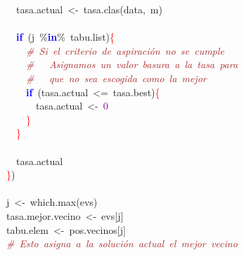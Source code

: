 \mbox{}\ \ \ \ \ \ tasa\textcolor{BrickRed}{.}actual\ \textcolor{BrickRed}{\textless{}-}\ tasa\textcolor{BrickRed}{.}clas\textcolor{BrickRed}{(}data\textcolor{BrickRed}{,}\ m\textcolor{BrickRed}{)} \\
\mbox{}\ \ \ \ \ \  \\
\mbox{}\ \ \ \ \ \ \textbf{\textcolor{Blue}{if}}\ \textcolor{BrickRed}{(}j\ \textcolor{BrickRed}{\%}\textbf{\textcolor{Blue}{in}}\textcolor{BrickRed}{\%}\ tabu\textcolor{BrickRed}{.}list\textcolor{BrickRed}{)}\textcolor{Red}{\{} \\
\mbox{}\ \ \ \ \ \ \ \ \textit{\textcolor{Brown}{\#\ Si\ el\ criterio\ de\ aspiración\ no\ se\ cumple}} \\
\mbox{}\ \ \ \ \ \ \ \ \textit{\textcolor{Brown}{\#\ \ \ Asignamos\ un\ valor\ basura\ a\ la\ tasa\ para}} \\
\mbox{}\ \ \ \ \ \ \ \ \textit{\textcolor{Brown}{\#\ \ \ que\ no\ sea\ escogida\ como\ la\ mejor}} \\
\mbox{}\ \ \ \ \ \ \ \ \textbf{\textcolor{Blue}{if}}\ \textcolor{BrickRed}{(}tasa\textcolor{BrickRed}{.}actual\ \textcolor{BrickRed}{\textless{}=}\ tasa\textcolor{BrickRed}{.}best\textcolor{BrickRed}{)}\textcolor{Red}{\{} \\
\mbox{}\ \ \ \ \ \ \ \ \ \ tasa\textcolor{BrickRed}{.}actual\ \textcolor{BrickRed}{\textless{}-}\ \textcolor{Purple}{0} \\
\mbox{}\ \ \ \ \ \ \ \ \textcolor{Red}{\}} \\
\mbox{}\ \ \ \ \ \ \textcolor{Red}{\}} \\
\mbox{}\ \ \ \ \ \  \\
\mbox{}\ \ \ \ \ \ tasa\textcolor{BrickRed}{.}actual \\
\mbox{}\ \ \ \ \textcolor{Red}{\}}\textcolor{BrickRed}{)} \\
\mbox{}\ \ \ \  \\
\mbox{}\ \ \ \ j\ \textcolor{BrickRed}{\textless{}-}\ which\textcolor{BrickRed}{.}max\textcolor{BrickRed}{(}evs\textcolor{BrickRed}{)} \\
\mbox{}\ \ \ \ tasa\textcolor{BrickRed}{.}mejor\textcolor{BrickRed}{.}vecino\ \textcolor{BrickRed}{\textless{}-}\ evs\textcolor{BrickRed}{[}j\textcolor{BrickRed}{]} \\
\mbox{}\ \ \ \ tabu\textcolor{BrickRed}{.}elem\ \textcolor{BrickRed}{\textless{}-}\ pos\textcolor{BrickRed}{.}vecinos\textcolor{BrickRed}{[}j\textcolor{BrickRed}{]} \\
\mbox{}\ \ \ \ \textit{\textcolor{Brown}{\#\ Esto\ asigna\ a\ la\ solución\ actual\ el\ mejor\ vecino}} \\
